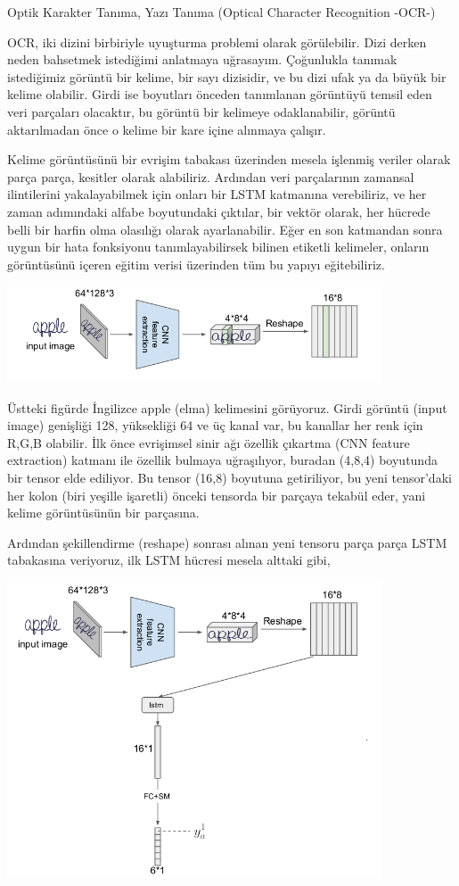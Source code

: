 \documentclass[12pt,fleqn]{article}\usepackage{../../common}
\begin{document}
Optik Karakter Tanıma, Yazı Tanıma (Optical Character Recognition -OCR-)

OCR, iki dizini birbiriyle uyuşturma problemi olarak görülebilir. Dizi
derken neden bahsetmek istediğimi anlatmaya uğrasayım. Çoğunlukla tanımak
istediğimiz görüntü bir kelime, bir sayı dizisidir, ve bu dizi ufak ya da
büyük bir kelime olabilir. Girdi ise boyutları önceden tanımlanan görüntüyü
temsil eden veri parçaları olacaktır, bu görüntü bir kelimeye
odaklanabilir, görüntü aktarılmadan önce o kelime bir kare içine alınmaya
çalışır.

Kelime görüntüsünü bir evrişim tabakası üzerinden mesela işlenmiş veriler
olarak parça parça, kesitler olarak alabiliriz. Ardından veri parçalarının
zamansal ilintilerini yakalayabilmek için onları bir LSTM katmanına
verebiliriz, ve her zaman adımındaki alfabe boyutundaki çıktılar, bir
vektör olarak, her hücrede belli bir harfin olma olasılığı olarak
ayarlanabilir. Eğer en son katmandan sonra uygun bir hata fonksiyonu
tanımlayabilirsek bilinen etiketli kelimeler, onların görüntüsünü içeren
eğitim verisi üzerinden tüm bu yapıyı eğitebiliriz.

\includegraphics[width=30em]{ocr_01.png}

Üstteki figürde İngilizce apple (elma) kelimesini görüyoruz. Girdi görüntü
(input image) genişliği 128, yüksekliği 64 ve üç kanal var, bu kanallar her
renk için R,G,B olabilir. İlk önce evrişimsel sinir ağı özellik çıkartma
(CNN feature extraction) katmanı ile özellik bulmaya uğraşılıyor, buradan
(4,8,4) boyutunda bir tensor elde ediliyor. Bu tensor (16,8) boyutuna
getiriliyor, bu yeni tensor'daki her kolon (biri yeşille işaretli) önceki
tensorda bir parçaya tekabül eder, yani kelime görüntüsünün bir parçasına.

Ardından şekillendirme (reshape) sonrası alınan yeni tensoru parça parça
LSTM tabakasına veriyoruz, ilk LSTM hücresi mesela alttaki gibi,

\includegraphics[width=30em]{ocr_02.png}
\end{document}
